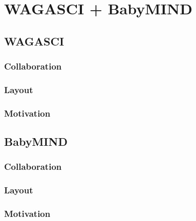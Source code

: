 \chapter{WAGASCI + BabyMIND}
\label{c:WAGASCI}

\section{WAGASCI}
\subsection{Collaboration}
\subsection{Layout}
\subsection{Motivation}

\section{BabyMIND}
\subsection{Collaboration}
\subsection{Layout}
\subsection{Motivation}